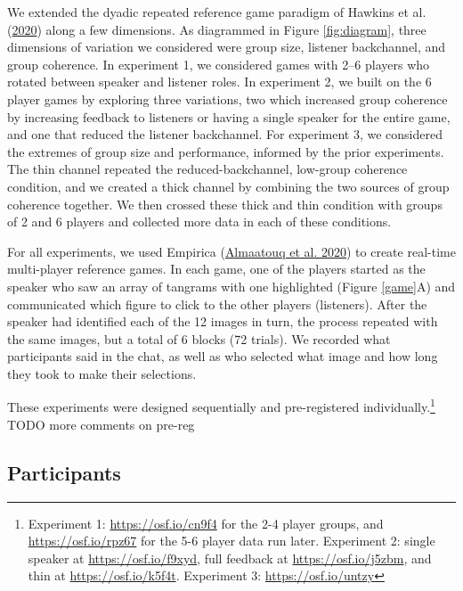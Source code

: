 \documentclass[
  english,
  a4paper,
]{article}
\begin{document}
We extended the dyadic repeated reference game paradigm of Hawkins et al. (\protect\hyperlink{ref-hawkinsCharacterizingDynamicsLearning2020}{2020}) along a few dimensions. As diagrammed in Figure \ref{fig:diagram}, three dimensions of variation we considered were group size, listener backchannel, and group coherence. In experiment 1, we considered games with 2--6 players who rotated between speaker and listener roles. In experiment 2, we built on the 6 player games by exploring three variations, two which increased group coherence by increasing feedback to listeners or having a single speaker for the entire game, and one that reduced the listener backchannel. For experiment 3, we considered the extremes of group size and performance, informed by the prior experiments. The thin channel repeated the reduced-backchannel, low-group coherence condition, and we created a thick channel by combining the two sources of group coherence together. We then crossed these thick and thin condition with groups of 2 and 6 players and collected more data in each of these conditions.

For all experiments, we used Empirica (\protect\hyperlink{ref-almaatouqEmpiricaVirtualLab2020}{Almaatouq et al. 2020}) to create real-time multi-player reference games. In each game, one of the players started as the speaker who saw an array of tangrams with one highlighted (Figure \ref{game}A) and communicated which figure to click to the other players (listeners). After the speaker had identified each of the 12 images in turn, the process repeated with the same images, but a total of 6 blocks (72 trials). We recorded what participants said in the chat, as well as who selected what image and how long they took to make their selections.

These experiments were designed sequentially and pre-registered individually.\footnote{Experiment 1: \url{https://osf.io/cn9f4} for the 2-4 player groups, and \url{https://osf.io/rpz67} for the 5-6 player data run later. Experiment 2: single speaker at \url{https://osf.io/f9xyd}, full feedback at \url{https://osf.io/j5zbm}, and thin at \url{https://osf.io/k5f4t}. Experiment 3: \url{https://osf.io/untzy}} TODO more comments on pre-reg

\hypertarget{participants}{%
\subsection{Participants}\label{participants}}
\end{document}
